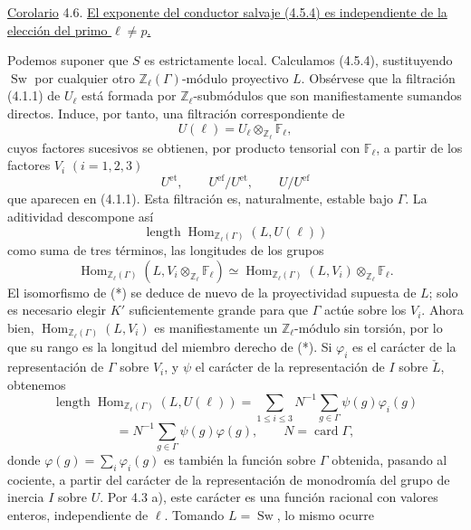 \medskip
\noindent
\underline{Corolario} 4.6. \underline{El exponente del conductor
salvaje (4.5.4) es independiente de la elección del primo
$\ell\neq p$.}

Podemos suponer que $S$ es estrictamente local. Calculamos (4.5.4),
sustituyendo $\operatorname{Sw}$ por cualquier otro
$\mathbb Z_\ell(\Gamma)$-módulo proyectivo $L$. Obsérvese que la
filtración (4.1.1) de $U_\ell$ está formada por
$\mathbb Z_\ell$-submódulos que son manifiestamente sumandos directos.
Induce, por tanto, una filtración correspondiente de
\[
 U(\ell)=U_\ell\otimes_{\mathbb Z_\ell}\mathbb F_\ell,
\]
cuyos factores sucesivos se obtienen, por producto tensorial con
$\mathbb F_\ell$, a partir de los factores $V_i$ $(i=1,2,3)$
\[
 U^{\mathrm{et}},\qquad
 U^{\mathrm{ef}}/U^{\mathrm{et}},\qquad
 U/U^{\mathrm{ef}}
\]
que aparecen en (4.1.1). Esta filtración es, naturalmente, estable bajo
$\Gamma$. La aditividad descompone así
\[
 \operatorname{length}
 \operatorname{Hom}_{\mathbb Z_\ell(\Gamma)}(L,U(\ell))
\]
como suma de tres términos, las longitudes de los grupos
\begin{equation}\tag{*}
 \operatorname{Hom}_{\mathbb Z_\ell(\Gamma)}
   (L,V_i\otimes_{\mathbb Z_\ell}\mathbb F_\ell)
 \simeq
 \operatorname{Hom}_{\mathbb Z_\ell(\Gamma)}(L,V_i)
   \otimes_{\mathbb Z_\ell}\mathbb F_\ell.
\end{equation}
El isomorfismo de (*) se deduce de nuevo de la proyectividad supuesta de
$L$; solo es necesario elegir $K'$ suficientemente grande para que
$\Gamma$ actúe sobre los $V_i$. Ahora bien,
$\operatorname{Hom}_{\mathbb Z_\ell(\Gamma)}(L,V_i)$ es
manifiestamente un $\mathbb Z_\ell$-módulo sin torsión, por lo que su
rango es la longitud del miembro derecho de (*). Si $\varphi_i$ es el
carácter de la representación de $\Gamma$ sobre $V_i$, y $\psi$ el
carácter de la representación de $I$ sobre $\check L$, obtenemos
\begin{equation}\tag{4.6.1}
 \operatorname{length}
 \operatorname{Hom}_{\mathbb Z_\ell(\Gamma)}(L,U(\ell))
 =
 \sum_{1\leq i\leq3}N^{-1}
 \sum_{g\in\Gamma}\psi(g)\varphi_i(g)
\end{equation}
\[
 =N^{-1}\sum_{g\in\Gamma}\psi(g)\varphi(g),
 \qquad N=\operatorname{card}\Gamma,
\]
donde $\varphi(g)=\sum_i\varphi_i(g)$ es también la función sobre
$\Gamma$ obtenida, pasando al cociente, a partir del carácter de la
representación de monodromía del grupo de inercia $I$ sobre $U$. Por
4.3 a), este carácter es una función racional con valores enteros,
independiente de $\ell$. Tomando $L=\operatorname{Sw}$, lo mismo ocurre

